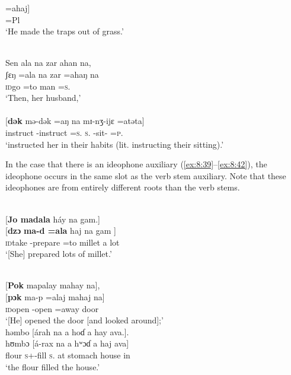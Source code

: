       \medskip
\gll =ahaj]\\
     =Pl\\ 
\glt  ‘He made the traps out of grass.’
\z


\ea \label{ex:8:38}\\
Sen  ala  na  zar  ahan  na,\\  
\gll  ʃɛŋ    =ala     na   zar   =ahaŋ    na \\
      \textsc{id}go     =to  {\PSP}    man   =\textsc{s}.{\POSS}    {\PSP}\\
\glt ‘Then, her husband,’\\

 \\
\gll  {}[\textbf{dək} mə{}-dək =aŋ na mɪ{}-nʒ-ijɛ =atəta]\\
      instruct  {\NOM}{}-instruct =\textsc{s}.{\IO}   \textsc{s}.{\DO}   {\NOM}{}-sit-{\CL}      =\textsc{p}.{\POSS}\\
\glt  ‘instructed her in their habits (lit. instructing their sitting).’ 
\z

In the case that there is an ideophone auxiliary (\ref{ex:8:39}--\ref{ex:8:42}), the ideophone occurs in the same slot as the verb stem auxiliary. Note that these ideophones are from entirely different roots than the verb stems. 


\ea \label{ex:8:39}\\
{}[\textbf{Jo madala}  háy  na  gam.]\\
\gll  {}[\textbf{dzɔ}    \textbf{ma-d    =ala}     haj  na      gam ]\\
      \textsc{id}take  {{\NOM}-prepare  =to}  millet       {\PSP}  {a lot}\\
\glt  ‘[She] prepared lots of millet.’
\z

\ea \label{ex:8:40}\\
{}[\textbf{Pok} mapalay  mahay  na], \\ 
\gll  {}[\textbf{pɔk} ma-p    =alaj      mahaj  na]\\
      \textsc{id}open  {\NOM}{}-open  =away   door     {\PSP}\\
\glt ‘[He] opened the door [and looked around];’\\

\medskip
həmbo  [árah  na  a  hoɗ  a  hay  ava.].\\
\gll  hʊmbɔ [á-rax na a hʷɔɗ a haj ava]\\
      flour  \textsc{s}+{\IFV}-fill  \textsc{s}.{\DO}  at       stomach  {\GEN}   house  in\\
\glt  ‘the flour filled the house.’
\z

